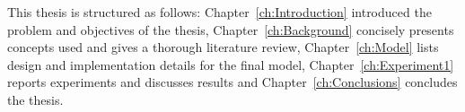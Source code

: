 This thesis is structured as follows: Chapter~\ref{ch:Introduction} introduced the problem and objectives of the thesis, Chapter~\ref{ch:Background} concisely presents concepts used and gives a thorough literature review, Chapter~\ref{ch:Model} lists design and implementation details for the final model, Chapter~\ref{ch:Experiment1} reports experiments and discusses results and Chapter~\ref{ch:Conclusions} concludes the thesis. 
